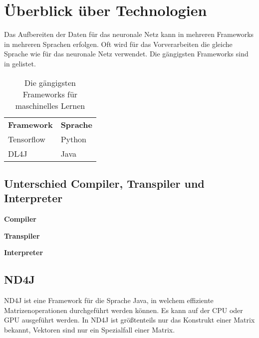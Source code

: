 
\chapter{Überblick über Technologien}

Das Aufbereiten der Daten für das neuronale Netz kann in mehreren Frameworks in mehreren Sprachen erfolgen.
Oft wird für das Vorverarbeiten die gleiche Sprache wie für das neuronale Netz verwendet.
Die gängigsten Frameworks sind in  gelistet.

\begin{table}[H]
	\centering
	\begin{tabular}{ | p{3cm} | p{3cm} | }
		\hline \rowcolor{gray!15}
		\textbf{Framework} & \textbf{Sprache} \\ \hhline{|=|=|}
		Tensorflow & Python \\ \hline
		DL4J & Java \\ \hline
	\end{tabular}
	\caption{Die gängigsten Frameworks für maschinelles Lernen}
	\label{tab:Frameworks}
\end{table}

\section{Unterschied Compiler, Transpiler und Interpreter}
\begin{description}
	\item{\textbf{Compiler}}
	\item{\textbf{Transpiler}}
	\item{\textbf{Interpreter}}
\end{description}

\section{ND4J}
ND4J ist eine Framework für die Sprache Java, in welchem effiziente Matrizenoperationen durchgeführt werden können.
Es kann auf der \ac{CPU} oder \ac{GPU} ausgeführt werden.
In ND4J ist größtenteils nur das Konstrukt einer Matrix bekannt, Vektoren sind nur ein Spezialfall einer Matrix.


\endinput
